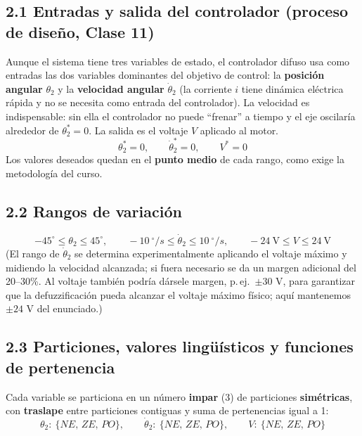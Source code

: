 \documentclass[11pt,a4paper]{article}
\newcommand{\grados}{^{\circ}}
\begin{document}
\subsection*{2.1 Entradas y salida del controlador (proceso de diseño, Clase 11)}

Aunque el sistema tiene tres variables de estado, el controlador difuso usa como entradas las dos variables dominantes del objetivo de control: la \textbf{posición angular} $\theta_2$ y la \textbf{velocidad angular} $\dot\theta_2$ (la corriente $i$ tiene dinámica eléctrica rápida y no se necesita como entrada del controlador). La velocidad es indispensable: sin ella el controlador no puede ``frenar'' a tiempo y el eje oscilaría alrededor de $\theta_2^{*}=0$. La salida es el voltaje $V$ aplicado al motor.
\[
\theta_2^{*}=0,\qquad \dot\theta_2^{*}=0,\qquad V^{*}=0
\]
Los valores deseados quedan en el \textbf{punto medio} de cada rango, como exige la metodología del curso.

\subsection*{2.2 Rangos de variación}

\[
-45\grados \le \theta_2 \le 45\grados,\qquad
-10\ \grados/s \le \dot\theta_2 \le 10\ \grados/s,\qquad
-24\ \mathrm{V} \le V \le 24\ \mathrm{V}
\]
(El rango de $\dot\theta_2$ se determina experimentalmente aplicando el voltaje máximo y midiendo la velocidad alcanzada; si fuera necesario se da un margen adicional del 20--30\%. Al voltaje también podría dársele margen, p.\,ej.\ $\pm 30$ V, para garantizar que la defuzzificación pueda alcanzar el voltaje máximo físico; aquí mantenemos $\pm 24$ V del enunciado.)

\subsection*{2.3 Particiones, valores lingüísticos y funciones de pertenencia}

Cada variable se particiona en un número \textbf{impar} (3) de particiones \textbf{simétricas}, con \textbf{traslape} entre particiones contiguas y suma de pertenencias igual a 1:
\[
\theta_2:\ \{NE,\,ZE,\,PO\},\qquad \dot\theta_2:\ \{NE,\,ZE,\,PO\},\qquad V:\ \{NE,\,ZE,\,PO\}
\]
\end{document}
